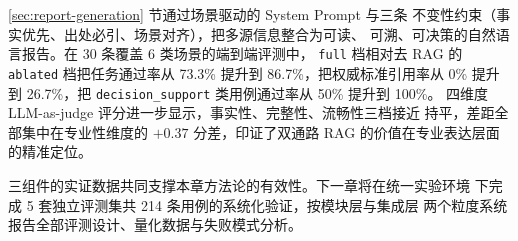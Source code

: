 \ref{sec:report-generation} 节通过场景驱动的 System Prompt 与三条
不变性约束（事实优先、出处必引、场景对齐），把多源信息整合为可读、
可溯、可决策的自然语言报告。在 30 条覆盖 6 类场景的端到端评测中，
\texttt{full} 档相对去 RAG 的 \texttt{ablated} 档把任务通过率从
73.3\% 提升到 86.7\%，把权威标准引用率从 0\% 提升到 26.7\%，把
\texttt{decision\_\bk{}support} 类用例通过率从 50\% 提升到 100\%。
四维度 LLM-as-judge 评分进一步显示，事实性、完整性、流畅性三档接近
持平，差距全部集中在专业性维度的 $+0.37$ 分差，印证了双通路 RAG
的价值在专业表达层面的精准定位。

三组件的实证数据共同支撑本章方法论的有效性。下一章将在统一实验环境
下完成 5 套独立评测集共 214 条用例的系统化验证，按模块层与集成层
两个粒度系统报告全部评测设计、量化数据与失败模式分析。
